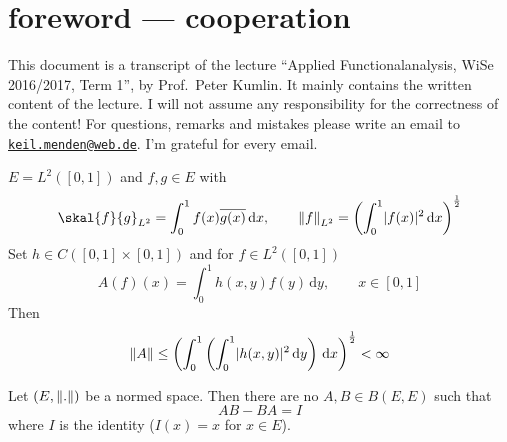 
\newcommand{\Semester}{WiSe 2016/2017, Term 1}
\newcommand{\fach}{Applied Functionalanalysis}
\newcommand{\prof}{Prof.\ Peter Kumlin}






\maketitle
\cleardoubleoddemptypage

\section*{foreword --- cooperation}
This document is a transcript of the lecture \enquote{\fach, \Semester}, by \prof.
It mainly contains the written content of the lecture. I will not assume any responsibility for the correctness of the content! For questions, remarks and mistakes please write an email to \href{mailto:keil.menden@web.de}{\nolinkurl{keil.menden@web.de}}. I'm grateful for every email. 
\newpage

\newpage

\tableofcontents
\cleardoubleoddemptypage
{}
\setcounter{page}{1}





















\begin{beispiel}
	$E = L^2([0,1])$ and $f,g \in E$ with
	\[
		\skal{f}{g}_{L^2} = \int_{0}^{1} f(x) \overline{g(x)} \,\mathrm{d}x, \qquad \norm{f}_{L^2} = \left( \int_{0}^{1} \abs{f(x)}^2 \,\mathrm{d}x \right)^{\frac{1}{2}}
	\]
	Set $h \in C([0,1] \times [0,1])$ and for $f \in L^2([0,1])$
	\[
		A(f)(x) = \int_{0}^{1} h(x,y)f(y) \,\mathrm{d}y, \qquad x \in [0,1]
	\]
	Then
	\[
		\norm{A} \leq \left( \int_{0}^{1} \left( \int_{0}^{1} \abs{h(x,y)}^2 \,\mathrm{d}y \right) \,\mathrm{d}x \right)^{\frac{1}{2}} < \infty
	\]
\end{beispiel}
\begin{beispiel}
	Let $(E, \norm{.})$ be a normed space. Then there are no $A,B \in B(E,E)$ such that
	\[
		AB - BA = I
	\]
	where $I$ is the identity ($I(x)=x$ for $x \in E$).
\end{beispiel}


